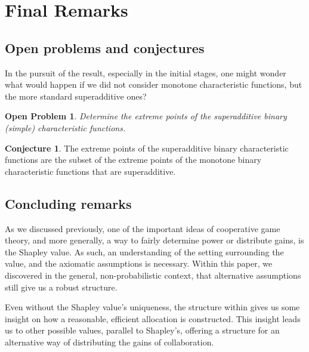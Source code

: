 \documentclass[12pt,letterpaper,final]{article}
\theoremstyle{plain}
\theoremstyle{plain}
\theoremstyle{plain}
\theoremstyle{plain}
\theoremstyle{plain}
\theoremstyle{plain}
\newtheorem{open-problem}[theorem]{Open Problem}
\theoremstyle{plain}
\theoremstyle{definition}
\theoremstyle{definition}
\newtheorem{conjecture}[definition]{Conjecture}
\theoremstyle{definition}
\theoremstyle{definition}
\theoremstyle{definition}
\theoremstyle{remark}
\theoremstyle{remark}
\theoremstyle{remark}
\theoremstyle{remark}
\begin{document}
%
 \section{Final Remarks}

\subsection{Open problems and conjectures}
\label{sec:open-probl-conj}

In the pursuit of the result, especially in the initial stages, one
might wonder what would happen if we did not consider monotone
characteristic functions, but the more standard superadditive ones?

\begin{open-problem}
  Determine the extreme points of the superadditive binary (simple)
  characteristic functions.
\end{open-problem}

\begin{conjecture}
  The extreme points of the superadditive binary characteristic
  functions are the subset of the extreme points of the monotone
  binary characteristic functions that are superadditive. 
\end{conjecture}

\subsection{Concluding remarks}

As we discussed previously, one of the important ideas of cooperative
game theory, and more generally, a way to fairly determine power or
distribute gains, is the Shapley value. As such, an understanding of
the setting surrounding the value, and the axiomatic assumptions is
necessary. Within this paper, we discovered in the general,
non-probabilistic context, that alternative assumptions still give us
a robust structure.

Even without the Shapley value's uniqueness, the structure within
gives us some insight on 
how a reasonable, efficient allocation is constructed. This insight
leads us to other possible values, parallel to Shapley's, offering a
structure for an alternative way of distributing the gains of
collaboration.

 
 
\end{document}
